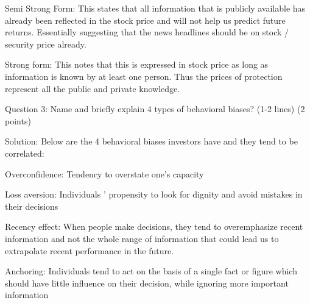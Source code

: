 \documentclass[]{article}
\begin{document}
Semi Strong Form: This states that all information that is publicly
available has already been reflected in the stock price and will not
help us predict future returns. Essentially suggesting that the news
headlines should be on stock / security price already.

Strong form: This notes that this is expressed in stock price as long as
information is known by at least one person. Thus the prices of
protection represent all the public and private knowledge.

Question 3: Name and briefly explain 4 types of behavioral biases? (1-2
lines) (2 points)

Solution: Below are the 4 behavioral biases investors have and they tend
to be correlated:

Overconfidence: Tendency to overstate one's capacity

Loss aversion: Individuals ' propensity to look for dignity and avoid
mistakes in their decisions

Recency effect: When people make decisions, they tend to overemphasize
recent information and not the whole range of information that could
lead us to extrapolate recent performance in the future.

Anchoring: Individuals tend to act on the basis of a single fact or
figure which should have little influence on their decision, while
ignoring more important information
\end{document}
